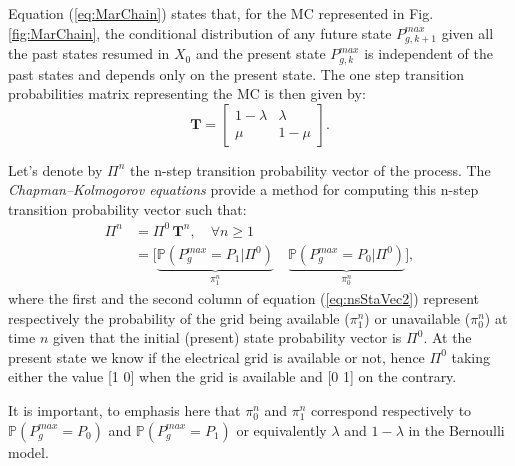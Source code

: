 \documentclass{ifacconf}
\begin{document}
Equation (\ref{eq:MarChain}) states that, for the MC represented in Fig. \ref{fig:MarChain}, the conditional distribution of any future state $P^{max}_{g,k+1}$ given all the past states resumed in $X_0$ and the present state $P^{max}_{g,k}$ is independent of the past states and
depends only on the present state. The one step transition probabilities matrix representing the MC is then given by: 
\begin{equation}\label{eq:MarChain_TransMat}
\mathbf{T} = 
  \begin{bmatrix}
 1-\lambda  & \lambda \\ 
 \mu & 1- \mu
\end{bmatrix} . 
\end{equation}

Let's denote by $\Pi^n$ the n-step transition probability vector of the process. The \textit{Chapman–Kolmogorov equations} provide a method for computing this n-step  transition probability vector such that: 
\begin{subequations}
    \begin{align}
    \Pi^n & = \Pi^0 \, \mathbf{T}^n, \quad \forall n \geq 1 \label{eq:nsStaVec1} \\
          & = \bigl[ \underbrace{\mathbb{P} (P_g^{max} = P_1 | \Pi^0)}_{\pi^n_1}\quad \underbrace{\mathbb{P} (P_g^{max} = P_0 | \Pi^0)}_{\pi_{0}^n} \bigl] \label{eq:nsStaVec2},
\end{align}
\end{subequations}
where the first and the second column of equation (\ref{eq:nsStaVec2}) represent respectively the probability of the grid being available ($\pi_{1}^n$) or unavailable ($\pi_{0}^n$) at time $n$ given that the initial (present) state probability vector  is $\Pi^0$. At the present state we know if the electrical grid is available or not, hence $\Pi^0$ taking either the value [1 0] when the grid is available and [0 1] on the contrary.

It is important, to emphasis here that $\pi^n_0$ and $\pi^n_1$ correspond respectively to $\mathbb{P}(P^{max}_g = P_0)$ and $\mathbb{P}(P^{max}_g = P_1)$ or equivalently $\lambda$ and $1-\lambda$  in the Bernoulli model.
\end{document}
